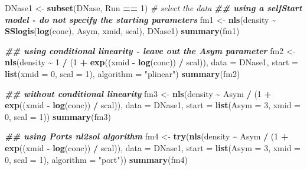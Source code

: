 \documentclass[
]{article}
\newenvironment{Shaded}{\begin{snugshade}}{\end{snugshade}}
\newcommand{\AttributeTok}[1]{\textcolor[rgb]{0.13,0.29,0.53}{#1}}
\newcommand{\CommentTok}[1]{\textcolor[rgb]{0.56,0.35,0.01}{\textit{#1}}}
\newcommand{\DecValTok}[1]{\textcolor[rgb]{0.00,0.00,0.81}{#1}}
\newcommand{\DocumentationTok}[1]{\textcolor[rgb]{0.56,0.35,0.01}{\textbf{\textit{#1}}}}
\newcommand{\FunctionTok}[1]{\textcolor[rgb]{0.13,0.29,0.53}{\textbf{#1}}}
\newcommand{\NormalTok}[1]{#1}
\newcommand{\OtherTok}[1]{\textcolor[rgb]{0.56,0.35,0.01}{#1}}
\newcommand{\SpecialCharTok}[1]{\textcolor[rgb]{0.81,0.36,0.00}{\textbf{#1}}}
\newcommand{\StringTok}[1]{\textcolor[rgb]{0.31,0.60,0.02}{#1}}
\begin{document}
\begin{Shaded}
\begin{Highlighting}[]
\NormalTok{DNase1 }\OtherTok{\textless{}{-}} \FunctionTok{subset}\NormalTok{(DNase, Run }\SpecialCharTok{==} \DecValTok{1}\NormalTok{) }\CommentTok{\# select the data}
\DocumentationTok{\#\# using a selfStart model {-} do not specify the starting parameters}
\NormalTok{fm1 }\OtherTok{\textless{}{-}} \FunctionTok{nls}\NormalTok{(density }\SpecialCharTok{\textasciitilde{}} \FunctionTok{SSlogis}\NormalTok{(}\FunctionTok{log}\NormalTok{(conc), Asym, xmid, scal), DNase1)}
\FunctionTok{summary}\NormalTok{(fm1)}

\DocumentationTok{\#\# using conditional linearity {-} leave out the Asym parameter}
\NormalTok{fm2 }\OtherTok{\textless{}{-}} \FunctionTok{nls}\NormalTok{(density }\SpecialCharTok{\textasciitilde{}} \DecValTok{1} \SpecialCharTok{/}\NormalTok{ (}\DecValTok{1} \SpecialCharTok{+} \FunctionTok{exp}\NormalTok{((xmid }\SpecialCharTok{{-}} \FunctionTok{log}\NormalTok{(conc)) }\SpecialCharTok{/}\NormalTok{ scal)),}
                 \AttributeTok{data =}\NormalTok{ DNase1, }\AttributeTok{start =} \FunctionTok{list}\NormalTok{(}\AttributeTok{xmid =} \DecValTok{0}\NormalTok{, }\AttributeTok{scal =} \DecValTok{1}\NormalTok{),}
                 \AttributeTok{algorithm =} \StringTok{"plinear"}\NormalTok{)}
\FunctionTok{summary}\NormalTok{(fm2)}

\DocumentationTok{\#\# without conditional linearity}
\NormalTok{fm3 }\OtherTok{\textless{}{-}} \FunctionTok{nls}\NormalTok{(density }\SpecialCharTok{\textasciitilde{}}\NormalTok{ Asym }\SpecialCharTok{/}\NormalTok{ (}\DecValTok{1} \SpecialCharTok{+} \FunctionTok{exp}\NormalTok{((xmid }\SpecialCharTok{{-}} \FunctionTok{log}\NormalTok{(conc)) }\SpecialCharTok{/}\NormalTok{ scal)),}
                 \AttributeTok{data =}\NormalTok{ DNase1,}
                 \AttributeTok{start =} \FunctionTok{list}\NormalTok{(}\AttributeTok{Asym =} \DecValTok{3}\NormalTok{, }\AttributeTok{xmid =} \DecValTok{0}\NormalTok{, }\AttributeTok{scal =} \DecValTok{1}\NormalTok{))}
\FunctionTok{summary}\NormalTok{(fm3)}

\DocumentationTok{\#\# using Port\textquotesingle{}s nl2sol algorithm}
\NormalTok{fm4 }\OtherTok{\textless{}{-}} \FunctionTok{try}\NormalTok{(}\FunctionTok{nls}\NormalTok{(density }\SpecialCharTok{\textasciitilde{}}\NormalTok{ Asym }\SpecialCharTok{/}\NormalTok{ (}\DecValTok{1} \SpecialCharTok{+} \FunctionTok{exp}\NormalTok{((xmid }\SpecialCharTok{{-}} \FunctionTok{log}\NormalTok{(conc)) }\SpecialCharTok{/}\NormalTok{ scal)),}
                 \AttributeTok{data =}\NormalTok{ DNase1, }\AttributeTok{start =} \FunctionTok{list}\NormalTok{(}\AttributeTok{Asym =} \DecValTok{3}\NormalTok{, }\AttributeTok{xmid =} \DecValTok{0}\NormalTok{, }\AttributeTok{scal =} \DecValTok{1}\NormalTok{),}
                 \AttributeTok{algorithm =} \StringTok{"port"}\NormalTok{))}
\FunctionTok{summary}\NormalTok{(fm4)}


\end{Highlighting}
\end{Shaded}
\end{document}
